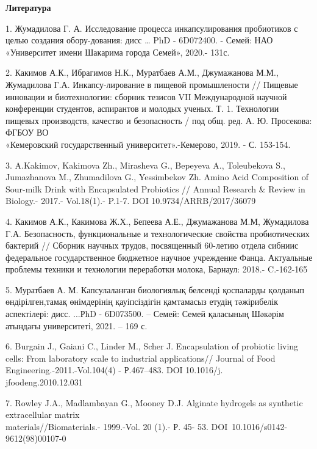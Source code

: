\begin{center}
	{\bfseries Литература}
	\end{center}
\begin{noparindent}

1. Жумадилова Г. А. Исследование процесса инкапсулирования пробиотиков с
целью создания обору-дования: дисс \ldots{} PhD - 6D072400. - Семей: НАО
«Университет имени Шакарима города Семей», 2020.- 131с.

2. Какимов А.К., Ибрагимов Н.К., Муратбаев А.М., Джумажанова М.М.,
Жумадилова Г.А. Инкапсу-лирование в пищевой промышлености // Пищевые
инновации и биотехнологии: сборник тезисов VII Международной научной
конференции студентов, аспирантов и молодых ученых. Т. 1. Технологии
пищевых производств, качество и безопасность / под общ. ред. А. Ю.
Просекова: ФГБОУ ВО \\«Кемеровский государственный университет».-Кемерово,
2019. - С. 153-154.

3. A.Kakimov, Kakimova Zh., Mirasheva G., Bepeyeva A., Toleubekova S.,
Jumazhanova M., Zhumadilova G., Yessimbekov Zh. Amino Acid Composition
of Sour-milk Drink with Encapsulated Probiotics // Annual Research \&
Review in Biology.- 2017.- Vol.18(1).- P.1-7. DOI 10.9734/ARRB/2017/36079

4. Какимов А.К., Какимова Ж.Х., Бепеева А.Е., Джумажанова М.М,
Жумадилова Г.А. Безопасность, функциональные и технологические свойства
пробиотических бактерий // Сборник научных трудов, посвященный 60-летию
отдела сибниис федеральное государственное бюджетное научное учреждение
Фанца. Актуальные проблемы техники и технологии переработки молока,
Барнаул: 2018.- C.-162-165

5. Муратбаев А. М. Капсулаланған биологиялық белсенді қоспаларды
қолданып өндірілген,тамақ өнімдерінің қауіпсіздігін қамтамасыз етудің
тәжірибелік аспектілері: дисс. ...РhD - 6D073500. -- Семей: Семей
қаласының Шәкәрім атындағы университеті, 2021. -- 169 с.

6. Burgain J., Gaiani C., Linder M., Scher J. Encapsulation of probiotic
living cells: From laboratory scale to industrial applications// Journal
of Food Engineering.-2011.-Vol.104(4) - Р.467--483. DOI
10.1016/j.\\jfoodeng.2010.12.031

7. Rowley J.A., Madlambayan G., Mooney D.J. Alginate hydrogels as
synthetic extracellular matrix \\materials//Biomaterials.- 1999.-Vol. 20
(1).- Р. 45- 53. DOI~10.1016/s0142-9612(98)00107-0


\end{noparindent}
